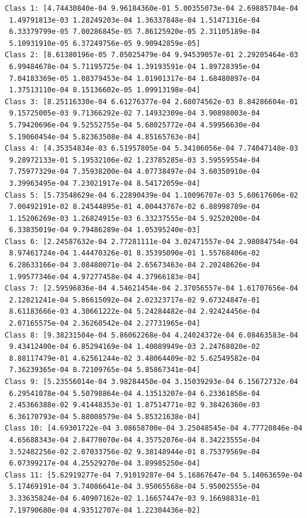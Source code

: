 \begin{verbatim}
Class 1: [4.74430840e-04 9.96184360e-01 5.00355073e-04 2.69885784e-04
 1.49791813e-03 1.28249203e-04 1.36337848e-04 1.51471316e-04
 6.33379799e-05 7.00286845e-05 7.86125920e-05 2.31105189e-04
 5.10931910e-05 6.37249756e-05 9.90942859e-05]
Class 2: [8.61380196e-05 7.05025479e-04 9.94539057e-01 2.29205464e-03
 6.99484678e-04 5.71195725e-04 1.39193591e-04 1.89728395e-04
 7.04183369e-05 1.08379453e-04 1.01901317e-04 1.68480897e-04
 1.37513110e-04 8.15136602e-05 1.09913198e-04]
Class 3: [8.25116330e-04 6.61276377e-04 2.68074562e-03 8.84286604e-01
 9.15725005e-03 9.71366292e-02 7.14932309e-04 3.90898003e-04
 5.79420696e-04 9.52552755e-04 5.68025772e-04 4.59956630e-04
 5.19060454e-04 5.82363508e-04 4.85165763e-04]
Class 4: [4.35354834e-03 6.51957805e-04 5.34106056e-04 7.74047148e-03
 9.28972133e-01 5.19532106e-02 1.23785285e-03 3.59559554e-04
 7.75977329e-04 7.35938200e-04 4.07738497e-04 3.60350910e-04
 3.39963495e-04 7.23021917e-04 8.54172059e-04]
Class 5: [5.73548629e-04 6.22890439e-04 1.10096707e-03 5.60617606e-02
 7.00492191e-02 8.24544895e-01 4.00443767e-02 6.88998789e-04
 1.15206269e-03 1.26824915e-03 6.33237555e-04 5.92520200e-04
 6.33835019e-04 9.79486289e-04 1.05395240e-03]
Class 6: [2.24587632e-04 2.77281111e-04 3.02471557e-04 2.98084754e-04
 8.97461724e-04 1.44470326e-01 8.35395090e-01 1.55768406e-02
 6.28633166e-04 3.08480071e-04 2.65673463e-04 2.20248626e-04
 1.99577346e-04 4.97277458e-04 4.37966183e-04]
Class 7: [2.59596836e-04 4.54621454e-04 2.37056557e-04 1.61707656e-04
 2.12821241e-04 5.86615092e-04 2.02323717e-02 9.67324847e-01
 8.61183666e-03 4.30661222e-04 5.24284482e-04 2.92424456e-04
 2.07165575e-04 2.36260542e-04 2.27731965e-04]
Class 8: [9.38231504e-04 5.86062268e-04 4.24024372e-04 6.08463583e-04
 9.43412400e-04 6.85294169e-04 1.40089949e-03 2.24768020e-02
 8.88117479e-01 4.62561244e-02 3.48064409e-02 5.62549582e-04
 7.36239365e-04 8.72109765e-04 5.85867341e-04]
Class 9: [5.23556014e-04 3.98284450e-04 3.15039293e-04 6.15672732e-04
 6.29541078e-04 5.50798864e-04 4.13513207e-04 6.23361858e-04
 2.45366388e-02 9.41448353e-01 1.87514771e-02 9.38426360e-03
 6.36170793e-04 5.88008579e-04 5.85321638e-04]
Class 10: [4.69301722e-04 3.08658700e-04 3.25048545e-04 4.77720846e-04
 4.65688343e-04 2.84770070e-04 4.35752076e-04 8.34223555e-04
 3.52482256e-02 2.07033756e-02 9.38148944e-01 8.75379569e-04
 6.07399217e-04 4.25529270e-04 3.89985250e-04]
Class 11: [5.62919277e-04 7.91019287e-04 5.16867647e-04 5.14063659e-04
 5.17469191e-04 3.74086641e-04 3.95065568e-04 5.95002555e-04
 3.33635824e-04 6.40907162e-02 1.16657447e-03 9.16698831e-01
 7.19790680e-04 4.93512707e-04 1.22304436e-02]

\end{verbatim}
